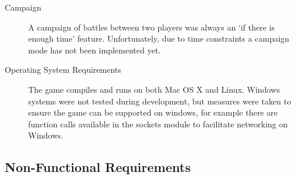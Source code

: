 \begin{description}
  \item[Campaign] A campaign of battles between two players was always an `if there is enough time' feature. Unfortunately, due to time constraints a campaign mode has not been implemented yet.

  \item[Operating System Requirements] The game compiles and runs on both Mac OS X and Linux. Windows systems were not tested during development, but measures were taken to ensure the game can be supported on windows, for example there are function calls available in the sockets module to facilitate networking on Windows.

\end{description}

\subsection{Non-Functional Requirements}

